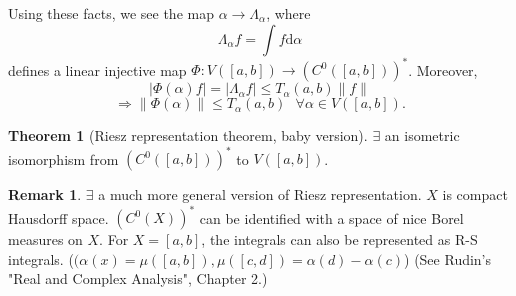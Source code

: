 \documentclass{article}
\theoremstyle{definition}
\newtheorem{thm}{Theorem}
\newtheorem{rem}{Remark}
\newcommand{\sfa}{\text{  } \forall}
\begin{document}
Using these facts, we see the map $\alpha \to \Lambda_\alpha$, where
\[
	\Lambda_\alpha f = \int f \mathrm{d} \alpha
\]
defines a linear injective map $\Phi:V([a, b]) \to (C^0([a, b]))^*$.
Moreover, 
\[
	|\Phi(\alpha) f| = |\Lambda_\alpha f| \leq T_\alpha(a, b) \|f\|
\]
\[
	\Rightarrow \|\Phi(\alpha)\| \leq T_\alpha(a, b) \sfa \alpha \in V([a, b]).
\]
\begin{thm}[Riesz representation theorem, baby version]
	$\exists$ an isometric isomorphism from $(C^0([a, b]))^*$ to $V([a, b])$.
\end{thm}

\begin{rem}
	$\exists$ a much more general version of Riesz representation.
	$X$ is compact Hausdorff space.
	$(C^0(X))^*$ can be identified with a space of nice Borel measures on $X$.
	For $X = [a, b]$, the integrals can also be represented as R-S integrals.
	($(\alpha(x) = \mu([a, b]), \mu([c, d]) = \alpha(d) - \alpha(c)$)
	(See Rudin's "Real and Complex Analysis", Chapter 2.)
\end{rem}
\end{document}
